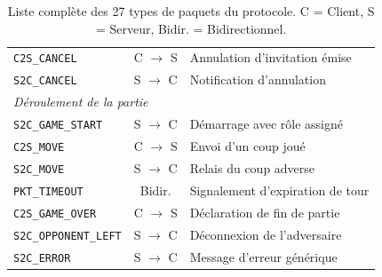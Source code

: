 \documentclass[a4paper]{article}
\begin{document}
\begin{table}[H]
\begin{tabularx}{\textwidth}{|l|c|X|}
        \texttt{C2S\_CANCEL} & C $\to$ S & Annulation d'invitation émise \\
        \texttt{S2C\_CANCEL} & S $\to$ C & Notification d'annulation \\
        \hline
        \multicolumn{3}{|l|}{\textit{Déroulement de la partie}} \\
        \hline
        \texttt{S2C\_GAME\_START} & S $\to$ C & Démarrage avec rôle assigné \\
        \texttt{C2S\_MOVE} & C $\to$ S & Envoi d'un coup joué \\
        \texttt{S2C\_MOVE} & S $\to$ C & Relais du coup adverse \\
        \texttt{PKT\_TIMEOUT} & Bidir. & Signalement d'expiration de tour \\
        \texttt{C2S\_GAME\_OVER} & C $\to$ S & Déclaration de fin de partie \\
        \texttt{S2C\_OPPONENT\_LEFT} & S $\to$ C & Déconnexion de l'adversaire \\
        \texttt{S2C\_ERROR} & S $\to$ C & Message d'erreur générique \\
        \hline
    \end{tabularx}
    \caption{Liste complète des 27 types de paquets du protocole. C = Client,
    S = Serveur, Bidir. = Bidirectionnel.}
    \label{tab:protocol-types}
\end{table}
\end{document}

